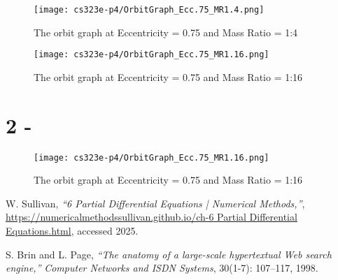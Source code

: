 \documentclass{article}
\begin{document}
\begin{figure}
    \centering
    \texttt{[image: cs323e-p4/OrbitGraph\_Ecc.75\_MR1.4.png]}
    \caption{The orbit graph at Eccentricity = 0.75 and Mass Ratio = 1:4}
    \label{fig:ecc.75_mr1.4}
\end{figure}

\begin{figure}
    \centering
    \texttt{[image: cs323e-p4/OrbitGraph\_Ecc.75\_MR1.16.png]}
    \caption{The orbit graph at Eccentricity = 0.75 and Mass Ratio = 1:16}
    \label{fig:ecc.75_mr1.16}
\end{figure}



\section{2 - }

\begin{figure}
    \centering
    \texttt{[image: cs323e-p4/OrbitGraph\_Ecc.75\_MR1.16.png]}
    \caption{The orbit graph at Eccentricity = 0.75 and Mass Ratio = 1:16}
    \label{fig:ecc.75_mr1.16}
\end{figure}


\begin{thebibliography}{9}

W. Sullivan,
\textit{``6 Partial Differential Equations | Numerical Methods,''},
\url{https://numericalmethodssullivan.github.io/ch-6 Partial Differential Equations.html}, 
accessed 2025.

S. Brin and L. Page,
\textit{``The anatomy of a large-scale hypertextual Web search engine,''}
\emph{Computer Networks and ISDN Systems}, 30(1-7): 107--117, 1998.

\end{thebibliography}
\end{document}
